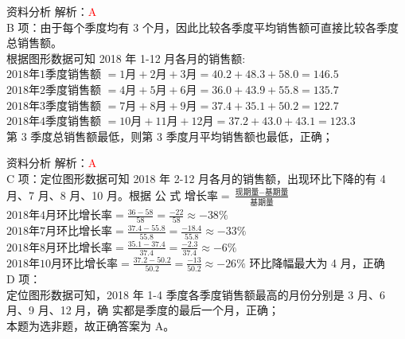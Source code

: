 \documentclass[aspectratio=169]{beamer}
\begin{document}
\begin{frame}[t]{资料分析}
    解析：\textcolor{red}{A}\\
    B 项：由于每个季度均有 3 个月，因此比较各季度平均销售额可直接比较各季度总销售额。\\
    根据图形数据可知 2018 年 1-12 月各月的销售额: 
    $\text{2018年1季度销售额 }= 1 \text{月} + 2 \text{月}  + 3 \text{月}   = 40.2 + 48.3 +58.0 = 146.5     $
    $\text{2018年2季度销售额 }= 4 \text{月} + 5 \text{月}  + 6 \text{月}   = 36.0 + 43.9 +55.8 = 135.7     $
    $\text{2018年3季度销售额 }= 7 \text{月} + 8 \text{月}  + 9 \text{月}   = 37.4 + 35.1 +50.2 = 122.7     $
    $\text{2018年4季度销售额 }= 10 \text{月} + 11 \text{月}  + 12 \text{月}   = 37.2 + 43.0 +43.1 = 123.3  $\\
    第 3 季度总销售额最低，则第 3 季度月平均销售额也最低，正确；\\
\end{frame}                           
\begin{frame}[t]{资料分析}
    解析：\textcolor{red}{A}\\
    C 项：定位图形数据可知 2018 年 2-12 月各月的销售额，出现环比下降的有 4 月、7 月、8 月、10 月。根据
    公 式 $\text{增长率} = \frac{\text{现期量} - \text{基期量}}{\text{基期量}}$
    $\text{2018年4月环比增长率} = \frac{36-58}{58} = \frac{-22}{58} \approx -38\%$
    $\text{2018年7月环比增长率} = \frac{37.4-55.8}{55.8} = \frac{-18.4}{55.8} \approx -33\%$
    $\text{2018年8月环比增长率} = \frac{35.1-37.4}{37.4} = \frac{-2.3}{37.4} \approx -6\%$
    $\text{2018年10月环比增长率} = \frac{37.2-50.2}{50.2} = \frac{-13}{50.2} \approx -26\%$
    环比降幅最大为 4 月，正确\\
    D 项：\\
    定位图形数据可知，2018 年 1-4 季度各季度销售额最高的月份分别是 3 月、6 月、9 月、12 月，确
    实都是季度的最后一个月，正确；\\
    本题为选非题，故正确答案为 A。 \\
\end{frame}                           
\end{document}
